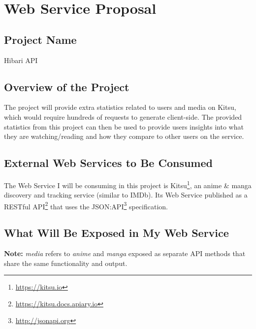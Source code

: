 \chapter{Web Service Proposal}
\section{Project Name}

Hibari API

\section{Overview of the Project}

The project will provide extra statistics related to users and media on Kitsu, which would require hundreds of requests to generate client-side. The provided statistics from this project can then be used to provide users insights into what they are watching/reading and how they compare to other users on the service.

\section{External Web Services to Be Consumed}

The Web Service I will be consuming in this project is Kitsu\footnote{\url{https://kitsu.io}}, an anime \& manga discovery and tracking service (similar to IMDb). Its Web Service published as a RESTful API\footnote{\url{https://kitsu.docs.apiary.io}} that uses the JSON:API\footnote{\url{http://jsonapi.org}} specification.

\section{What Will Be Exposed in My Web Service}

\textbf{Note:} \textit{media} refers to \textit{anime} and \textit{manga} exposed as separate API methods that share the same functionality and output.

